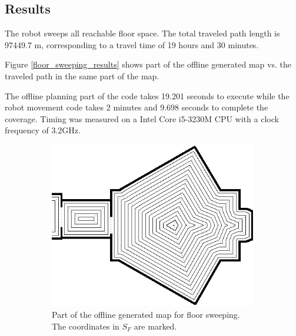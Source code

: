 \subsection{Results}
The robot sweeps all reachable floor space.
The total traveled path length is 97449.7 m, corresponding to a travel time of 19 hours and 30 minutes.

Figure \ref{floor_sweeping_results} shows part of the offline generated map vs. the traveled path in the same part of the map.

The offline planning part of the code takes 
19.201 seconds to execute
while the robot movement code takes
2 minutes and 9.698 seconds 
to complete the coverage.
Timing was measured on a Intel Core i5-3230M CPU with a clock frequency of 3.2GHz.

\begin{figure}[ht]
\centering
  \begin{subfigure}[t]{0.3\textwidth}
    \includegraphics[width = \textwidth]{graphics/floor_sweep_plan}
    \caption{Part of the offline generated map for floor sweeping. The coordinates in \(S_{F}\) are marked.}
    \label{floor_sweep_plan}
  \end{subfigure}
  \begin{subfigure}[t]{0.3\textwidth}

\end{subfigure}
\end{figure}
